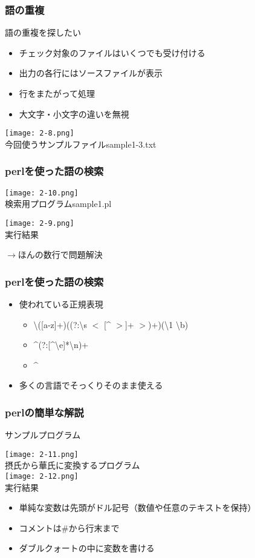 \documentclass[dvipdfmx,11pt,notheorems]{beamer}
\begin{document}
\begin{frame}
\frametitle{語の重複}
語の重複を探したい
\begin{itemize}
\item チェック対象のファイルはいくつでも受け付ける
\item 出力の各行にはソースファイルが表示
\item 行をまたがって処理
\item 大文字・小文字の違いを無視
\end{itemize}
\begin{center}
\texttt{[image: 2-8.png]}\\
今回使うサンプルファイルsample1-3.txt
\end{center}
\end{frame}

\begin{frame}
\frametitle{perlを使った語の検索}
\begin{center}
\texttt{[image: 2-10.png]}\\
検索用プログラムsample1.pl
\end{center}
\vspace{\baselineskip}
\begin{center}
\texttt{[image: 2-9.png]}\\
実行結果\\
\end{center}
$\rightarrow$ほんの数行で問題解決
\end{frame}

\begin{frame}
\frametitle{perlを使った語の検索}
\begin{itemize}
\item 使われている正規表現
\begin{itemize}
\item \textbackslash ([a-z]+)((?:\textbackslash s \textbar $<$ [\^{} $>$]+ $>$)+)(\textbackslash 1 \textbackslash b)
\item \^{}(?:[\^{}\textbackslash e]*\textbackslash n)+
\item \^{}
\end{itemize}
\item 多くの言語でそっくりそのまま使える
\end{itemize}
\end{frame}

\begin{frame}
\frametitle{perlの簡単な解説}
サンプルプログラム
\begin{center}
\texttt{[image: 2-11.png]}\\
摂氏から華氏に変換するプログラム\\
\vspace{\baselineskip}
\texttt{[image: 2-12.png]}\\
実行結果
\end{center}
\begin{itemize}
\item 単純な変数は先頭がドル記号（数値や任意のテキストを保持）
\item コメントは\#から行末まで
\item ダブルクォートの中に変数を書ける
\end{itemize}
\end{frame}
\end{document}
